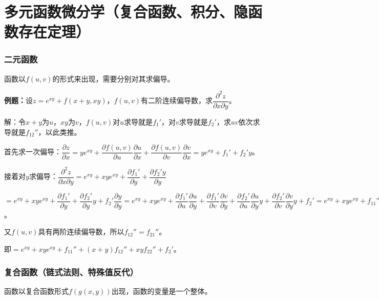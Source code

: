 \newpage
\section{多元函数微分学（复合函数、积分、隐函数存在定理）}

\paragraph{}

\subsubsection{二元函数}

函数以$f(u,v)$的形式来出现，需要分别对其求偏导。

\textbf{例题：}设$z=e^{xy}+f(x+y,xy)$，$f(u,v)$有二阶连续偏导数，求$\dfrac{\partial^2z}{\partial x\partial y}$。

解：令$x+y$为$u$，$xy$为$v$，$f(u,v)$对$u$求导就是$f_1'$，对$v$求导就是$f_2'$，求$uv$依次求导就是$f_{12}''$，以此类推。

首先求一次偏导：$\dfrac{\partial z}{\partial x}=ye^{xy}+\dfrac{\partial f(u,v)}{\partial u}\dfrac{\partial u}{\partial x}+\dfrac{\partial f(u,v)}{\partial v}\dfrac{\partial v}{\partial x}=ye^{xy}+f_1'+f_2'y$。

接着对$y$求偏导：$\dfrac{\partial^2z}{\partial x\partial y}=e^{xy}+xye^{xy}+\dfrac{\partial f_1'}{\partial y}+\dfrac{\partial f_2'y}{\partial y}$

$=e^{xy}+xye^{xy}+\dfrac{\partial f_1'}{\partial y}+\dfrac{\partial f_2'}{\partial y}y+f_2'\dfrac{\partial y}{\partial y}=e^{xy}+xye^{xy}+\dfrac{\partial f_1'}{\partial u}\dfrac{\partial u}{\partial y}+\dfrac{\partial f_1'}{\partial v}\dfrac{\partial v}{\partial y}+\dfrac{\partial f_2'}{\partial u}\dfrac{\partial u}{\partial y}y+\dfrac{\partial f_2'}{\partial v}\dfrac{\partial v}{\partial y}y+f_2'=e^{xy}+xye^{xy}+f_{11}''+f_{12}''x+f_{21}''y+f_{22}''xy+f_2'$。\medskip

又$f(u,v)$具有两阶连续偏导数，所以$f_{12}''=f_{21}''$。

即$=e^{xy}+xye^{xy}+f_{11}''+(x+y)f_{12}''+xyf_{22}''+f_2'$。

\subsubsection{复合函数（链式法则、特殊值反代）}

函数以复合函数形式$f(g(x,y))$出现，函数的变量是一个整体。

